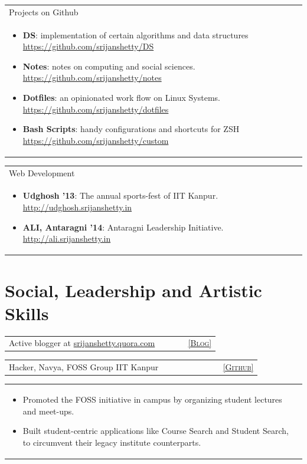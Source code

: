\documentclass[a4paper,10pt]{article} %
\newcommand{\iproject}[3]{
    \begin{tabular}{p{0.85\linewidth}r}
        \textcolor{NavyBlue}{#2} & \multicolumn{1}{m{3cm}}{\raggedleft \textsc{#1}}\\
    \end{tabular}
    \begin{tabular}{p{\linewidth}}
    \vspace{-0.3cm}
        \footnotesize{#3}
    \end{tabular}
    \vspace{-0.5cm}
}
\newcommand{\projectlist}[2]{
    \begin{tabular}{p{\linewidth}}
        \textcolor{NavyBlue}{#1}\\
        \vspace{-0.3cm}
        \footnotesize{#2}
    \end{tabular}
    \vspace{-0.4cm}
}
\newcommand{\skill}[2]{
    \begin{tabular}{p{0.85\linewidth}r}
        #2 & \multicolumn{1}{m{3cm}}{\raggedleft \textsc{#1}}\\
    \end{tabular}
    \vspace{-0.5cm}
}
\begin{document}
\projectlist {Projects on Github}
             {
                 \begin{itemize}[leftmargin=0.5cm]
                     \item \textbf{DS}: implementation of certain algorithms and data structures
                         \href{https://github.com/srijanshetty/DS} {https://github.com/srijanshetty/DS}
                     \item \textbf{Notes}: notes on computing and social sciences.
                         \href{https://github.com/srijanshetty/notes} {https://github.com/srijanshetty/notes}
                     \item \textbf{Dotfiles}: an opinionated work flow on Linux Systems.
                         \href{https://github.com/srijanshetty/dotfiles} {https://github.com/srijanshetty/dotfiles}
                     \item \textbf{Bash Scripts}: handy configurations and shortcuts for ZSH
                         \href{https://github.com/srijanshetty/custom} {https://github.com/srijanshetty/custom}
                 \end{itemize}
             }

\projectlist {Web Development}
             {
                 \begin{itemize}[leftmargin=0.5cm]
                     \item \textbf{Udghosh '13}: The annual sports-fest of IIT Kanpur.
                         \href{http://udghosh.srijanshetty.in}{http://udghosh.srijanshetty.in}
                     \item \textbf{ALI, Antaragni '14}: Antaragni Leadership Initiative.
                         \href{http://ali.srijanshetty.in} {http://ali.srijanshetty.in}
                 \end{itemize}
             }


\section {Social, Leadership and Artistic Skills}

\skill {\href{srijanshetty.quora.com} {[Blog]}}
       {Active blogger at \href{srijanshetty.quora.com} {srijanshetty.quora.com}}

\iproject {\href{https://github.com/navya} {[Github]} }
          {Hacker, Navya, FOSS Group IIT Kanpur}
          {
               \begin{itemize}[leftmargin=0.5cm]
                   \item Promoted the FOSS initiative in campus by organizing student lectures and meet-ups.
                   \item Built student-centric applications like Course Search and Student Search, to circumvent
                       their legacy institute counterparts.
               \end{itemize}
          }
\end{document}
